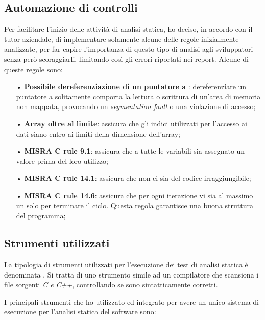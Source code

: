 \subsection{Automazione di controlli}
Per facilitare l'inizio delle attività di analisi statica, ho deciso, in accordo con il tutor aziendale, di implementare solamente alcune delle regole inizialmente analizzate, per far capire l'importanza di questo tipo di analisi agli sviluppatori senza però scoraggiarli, limitando così gli errori riportati nei report.
Alcune di queste regole sono:
\begin{itemize}
\item[•] \textbf{Possibile dereferenziazione di un puntatore a }: dereferenziare un puntatore a  solitamente comporta la lettura o scrittura di un'area di memoria non mappata, provocando un \textit{segmentation fault} o una violazione di accesso;

\item[•] \textbf{Array oltre al limite}: assicura che gli indici utilizzati per l'accesso ai dati siano entro ai limiti della dimensione dell'array;

\item[•] \textbf{MISRA C rule 9.1}: assicura che a tutte le variabili sia assegnato un valore prima del loro utilizzo;

\item[•] \textbf{MISRA C rule 14.1}: assicura che non ci sia del codice irraggiungibile;

\item[•] \textbf{MISRA C rule 14.6}: assicura che per ogni iterazione vi sia al massimo un solo  per terminare il ciclo. Questa regola garantisce una buona struttura del programma;


\end{itemize}

\subsection{Strumenti utilizzati}
La tipologia di strumenti utilizzati per l'esecuzione dei test di analisi statica è denominata . Si tratta di uno strumento simile ad un compilatore che scansiona i file sorgenti \textit{C e C++}, controllando se sono sintatticamente corretti.

I principali strumenti che ho utilizzato ed integrato per avere un unico sistema di esecuzione per l'analisi statica del software sono:

